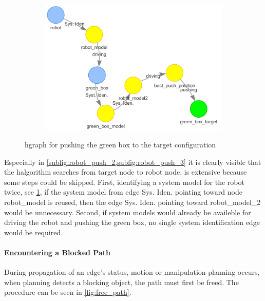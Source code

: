 \begin{figure}[H]
\begin{subfigure}{.3\textwidth}
    \includegraphics[width=1.2\textwidth]{figures/connecting_nodes/robot_push_6}
    \caption{}\label{subfig:robot_push_6}
    \end{subfigure}
    \caption{\ac{hgraph} for pushing the green box to the target configuration}%
    \label{fig:robot_push_hgraph}
\end{figure}
Especially in \cref{subfig:robot_push_2,subfig:robot_push_3} it is clearly visible that the \ac{halgorithm} searches from target node to robot node.  is extensive because some steps could be skipped. First, identifying a system model for the robot twice, see \cref{subfig:robot_push_6}, if the system model from edge Sys. Iden. pointing toward node robot\_model is reused, then the edge Sys. Iden. pointing toward robot\_model\_2 would be unnecessary. Second, if system models would already be availeble for driving the robot and pushing the green box, no single system identification edge would be required.\bs

\paragraph{Encountering a Blocked Path}%
During propagation of an edge's status, motion or manipulation planning occurs, when planning detects a blocking object, the path must first be freed. The procedure can be seen in \cref{fig:free_path}.\bs

